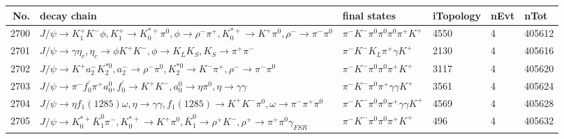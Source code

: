 \begin{table}[htbp] 
\begin{center}
\begin{small}
\begin{tabular}{rlllll}\hline\hline
 No. & decay chain & final states &  iTopology & nEvt & nTot \\\hline
2700&$J/\psi       \rightarrow K_1^{+}        K^{-}          \phi           , K_1^{+}         \rightarrow K_{0}^{*+}     \pi^{0}        , \phi            \rightarrow \rho^{-}      \pi^{+}        , K_{0}^{*+}      \rightarrow K^{+}          \pi^{0}        , \rho^{-}       \rightarrow \pi^{-}        \pi^{0}        $&$\pi^{-}        K^{-}          \pi^{0}        \pi^{0}        \pi^{0}        \pi^{+}        K^{+}          $& 4550&    4&405612\\
2701&$J/\psi       \rightarrow \gamma       \eta_{c}    , \eta_{c}     \rightarrow \phi           K^{+}          K^{-}          , \phi            \rightarrow K_{L}          K_{S}          , K_{S}           \rightarrow \pi^{+}        \pi^{-}        $&$\pi^{-}        K^{-}          K_{L}          \pi^{+}        \gamma       K^{+}          $& 2130&    4&405616\\
2702&$J/\psi       \rightarrow K^{+}          a_{2}^{-}      K_2^{*0}       , a_{2}^{-}       \rightarrow \rho^{-}      \pi^{0}        , K_2^{*0}        \rightarrow K^{-}          \pi^{+}        , \rho^{-}       \rightarrow \pi^{-}        \pi^{0}        $&$\pi^{-}        K^{-}          \pi^{0}        \pi^{0}        \pi^{+}        K^{+}          $& 3117&    4&405620\\
2703&$J/\psi       \rightarrow \pi^{-}        f^{'}_{0}     \pi^{+}        a_{0}^{0}      , f^{'}_{0}      \rightarrow K^{+}          K^{-}          , a_{0}^{0}       \rightarrow \eta          \pi^{0}        , \eta           \rightarrow \gamma       \gamma       $&$\pi^{-}        K^{-}          \pi^{0}        \pi^{+}        \gamma       \gamma       K^{+}          $& 3561&    4&405624\\
2704&$J/\psi       \rightarrow \eta          f_{1}(1285)    \omega         , \eta           \rightarrow \gamma       \gamma       , f_{1}(1285)     \rightarrow K^{+}          K^{-}          \pi^{0}        , \omega          \rightarrow \pi^{-}        \pi^{+}        \pi^{0}        $&$\pi^{-}        K^{-}          \pi^{0}        \pi^{0}        \pi^{+}        \gamma       \gamma       K^{+}          $& 4569&    4&405628\\
2705&$J/\psi       \rightarrow K_{0}^{*+}     \bar{K}_1^{0} \pi^{-}        , K_{0}^{*+}      \rightarrow K^{+}          \pi^{0}        , \bar{K}_1^{0}  \rightarrow \rho^{+}      K^{-}          , \rho^{+}       \rightarrow \pi^{+}        \pi^{0}        \gamma_{FSR} $&$\pi^{-}        K^{-}          \pi^{0}        \pi^{0}        \pi^{+}        K^{+}          $&  496&    4&405632\\

\end{tabular}
\end{small}
\end{center}
\end{table}
